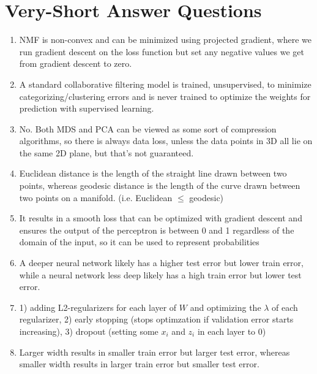 \documentclass{article}
\def\enum#1{\begin{enumerate}#1\end{enumerate}}
\begin{document}
\section{Very-Short Answer Questions}


\enum{
\item NMF is non-convex and can be minimized using projected gradient, where we run gradient descent on the loss function but set any negative values we get from gradient descent to zero.
\item A standard collaborative filtering model is trained, unsupervised, to minimize categorizing/clustering errors and is never trained to optimize the weights for prediction with supervised learning.
\item No. Both MDS and PCA can be viewed as some sort of compression algorithms, so there is always data loss, unless the data points in 3D all lie on the same 2D plane, but that's not guaranteed.
\item Euclidean distance is the length of the straight line drawn between two points, whereas geodesic distance is the length of the curve drawn between two points on a manifold. (i.e. Euclidean $\leq$ geodesic)
\item It results in a smooth loss that can be optimized with gradient descent and ensures the output of the perceptron is between 0 and 1 regardless of the domain of the input, so it can be used to represent probabilities
\item A deeper neural network likely has a higher test error but lower train error, while a neural network less deep likely has a high train error but lower test error.
\item 1) adding L2-regularizers for each layer of $W$ and optimizing the $\lambda$ of each regularizer, 2) early stopping (stops optimzation if validation error starts increasing), 3) dropout (setting some $x_i$ and $z_i$ in each layer to 0)
\item  Larger width results in smaller train error but larger test error, whereas smaller width results in larger train error but smaller test error.
}
\end{document}

